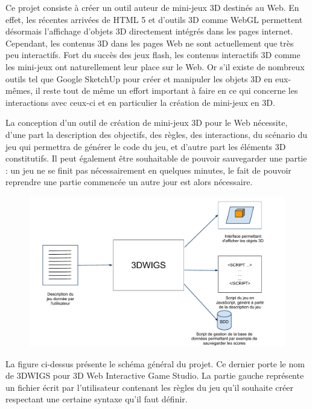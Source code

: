 Ce projet consiste à créer un outil auteur de mini-jeux 3D destinés au Web.
En effet, les récentes arrivées de HTML 5 et d'outils 3D comme WebGL permettent désormais l'affichage d'objets 3D directement
intégrés dans les pages internet.
Cependant, les contenus 3D dans les pages Web ne sont actuellement que très peu interactifs.
Fort du succès des jeux flash, les contenus interactifs 3D comme les mini-jeux ont naturellement leur place sur le Web.
Or s'il existe de nombreux outils tel que Google SketchUp pour créer et manipuler les objets 3D en eux-mêmes,
il reste tout de même un effort important à faire en ce qui concerne les interactions avec ceux-ci et en particulier la création de mini-jeux en 3D.


\vspace{0.5cm}

La conception d'un outil de création de mini-jeux 3D pour le Web nécessite, d'une part la description des objectifs, des règles, des interactions, 
du scénario du jeu qui permettra de générer le code du jeu, et d'autre part les éléments 3D constitutifs.
Il peut également être souhaitable de pouvoir sauvegarder une partie :
un jeu ne se finit pas nécessairement en quelques minutes, le fait de pouvoir reprendre une partie commencée un autre jour est alors nécessaire.

\vspace{0.5cm}

\begin{figure}[h]
 \centering
 \includegraphics[width=\textwidth]{img/schema_general}
\end{figure}

\vspace{0.8cm}

La figure ci-dessus présente le schéma général du projet.
Ce dernier porte le nom de 3DWIGS pour 3D Web Interactive Game Studio.
La partie gauche représente un fichier écrit par l'utilisateur contenant les règles du jeu qu'il souhaite créer respectant
une certaine syntaxe qu'il faut définir.

